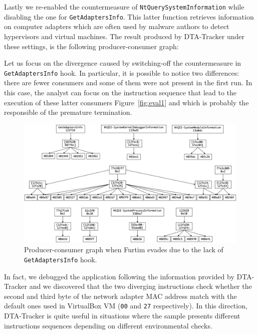 \documentclass[LaM,binding=0.6cm]{sapthesis}
\begin{document}
Lastly we re-enabled the countermeasure of \texttt{NtQuerySystemInformation} while disabling the one for \texttt{GetAdaptersInfo}. This latter function retrieves information on computer adapters which are often used by malware authors to detect hypervisors and virtual machines. The result produced by {\sf DTA-Tracker} under these settings, is the following producer-consumer graph:

Let us focus on the divergence caused by switching-off the countermeasure in \texttt{GetAdaptersInfo} hook. In particular, it is possible to notice two differences: there are fewer consumers and some of them were not present in the first run. In this case, the analyst can focus on the instruction sequence that lead to the execution of these latter consumers Figure~\ref{fig:eval1} and which is probably the responsible of the premature termination.

\clearpage
\begin{figure}[h!]
\centering%
\includegraphics[width=\textwidth]{images/eval3_def}
\caption{Producer-consumer graph when Furtim evades due to the lack of \texttt{GetAdaptersInfo} hook.}
\end{figure}

\noindent
In fact, we debugged the application following the information provided by {\sf DTA-Tracker} and we discovered that the two diverging instructions check whether the second and third byte of the network adapter MAC address match with the default ones used in VirtualBox VM (\texttt{00} and \texttt{27} respectively). In this direction, {\sf DTA-Tracker} is quite useful in situations where the sample presents different instructions sequences depending on different environmental checks.
\end{document}
